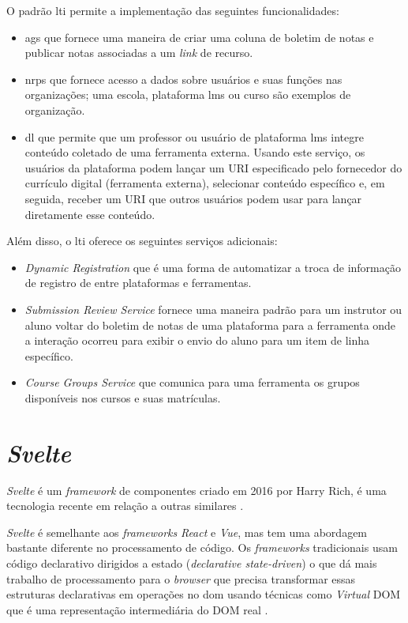 O padrão \gls{lti} permite a implementação das seguintes funcionalidades:
\begin{itemize}[label=$\sbullet$]
    \item \gls{ags} que fornece uma maneira de criar uma coluna de boletim de notas e publicar notas associadas a um \textit{link} de recurso.
    \item \gls{nrps} que fornece acesso a dados sobre usuários e suas funções nas organizações; uma escola, plataforma \gls{lms} ou curso são exemplos de organização.
    \item \gls{dl} que permite que um professor ou usuário de plataforma \gls{lms} integre conteúdo coletado de uma ferramenta externa. Usando este serviço, os usuários da plataforma podem lançar um URI especificado pelo fornecedor do currículo digital (ferramenta externa), selecionar conteúdo específico e, em seguida, receber um URI que outros usuários podem usar para lançar diretamente esse conteúdo.
\end{itemize}

Além disso, o \gls{lti} oferece os seguintes serviços adicionais:

\begin{itemize}[label=$\sbullet$]
    \item \textit{Dynamic Registration} que é uma forma de automatizar a troca de informação de registro de entre plataformas e ferramentas.
    \item \textit{Submission Review Service} fornece uma maneira padrão para um instrutor ou aluno voltar do boletim de notas de uma plataforma para a ferramenta onde a interação ocorreu para exibir o envio do aluno para um item de linha específico.
    \item \textit{Course Groups Service} que comunica para uma ferramenta os grupos disponíveis nos cursos e suas matrículas.
\end{itemize}

\section{\textit{Svelte}}
\textit{Svelte} é um \textit{framework} de componentes criado em 2016 por Harry Rich, é uma tecnologia recente em relação a outras similares \cite{krill_slim_2016}.

\textit{Svelte} é semelhante aos \textit{frameworks} \textit{React} e \textit{Vue}, mas tem uma abordagem bastante diferente no processamento de código. Os \textit{frameworks} tradicionais usam código declarativo dirigidos a estado (\textit{declarative state-driven}) o que dá mais trabalho de processamento para o \textit{browser} que precisa transformar essas estruturas declarativas em operações no \gls{dom} usando técnicas como \textit{Virtual} DOM que é uma representação intermediária do DOM real \cite{harris_svelte_2019}.

